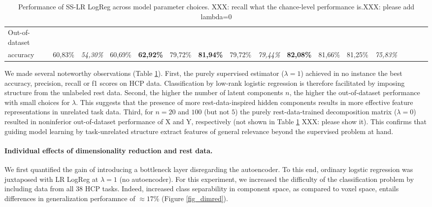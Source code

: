 \documentclass{article} %
\begin{document}
\begin{table}[h]
{\begin{tabular}{l|cccc|cccc|cccc|cccc|}
  Out-of-dataset \\accuracy & 60,83\%                            & \textit{54,30\%}                   & 60,69\%                           & \textbf{62,92\%}                 & 79,72\%                              & \textbf{81,94\%} & 79,72\%          & \textit{79,44\%}                     & \textbf{82,08\%} & 81,66\%         & 81,25\%          & \textit{75,83\%}                   \\ \hline
  \end{tabular}
}
\vspace{-0.2cm}
 \caption{Performance of SS-LR LogReg across model parameter choices. XXX: recall what the chance-level performance is.XXX: please add lambda=0}
  \label{table_two}
\end{table}

We made several noteworthy observations (Table \ref{table_two}).
%
First, the purely supervised estimator ($\lambda=1$) achieved in no
instance the best accuracy, precision, recall or f1 scores on HCP data.
Classification by low-rank logistic regression is therefore facilitated by
imposing structure from the unlabeled rest data.
%
Second, the higher the number of latent components $n$,
the higher the out-of-dataset performance with small choices for $\lambda$.
This suggests that the presence of more rest-data-inspired hidden components
results in more effective feature representations in unrelated task data.
%
Third, for $n=20$ and $100$ (but not $5$) the purely rest-data-trained
decomposition matrix ($\lambda=0$) resulted in
noninferior out-of-dataset performance
of X and Y, respectively (not shown in Table \ref{table_two} XXX: please show it).
This confirms that guiding model learning by task-unrelated structure
extract features of general relevance
beyond the supervised problem at hand.


\paragraph{Individual effects of dimensionality reduction and rest data.}
We first quantified the gain of introducing a bottleneck layer
disregarding the autoencoder.
To this end, ordinary logstic regression was juxtaposed
with LR LogReg  at $\lambda=1$ (no autoencoder).
For this experiment, we increased the difficulty of the classification problem
by including data from all 38 HCP tasks.
Indeed, increased class separability in component space,
as compared to voxel space, entails differences in
generalization perforamnce of
$\approx{17\%}$ (Figure \ref{fig_dimred}).
\end{document}
